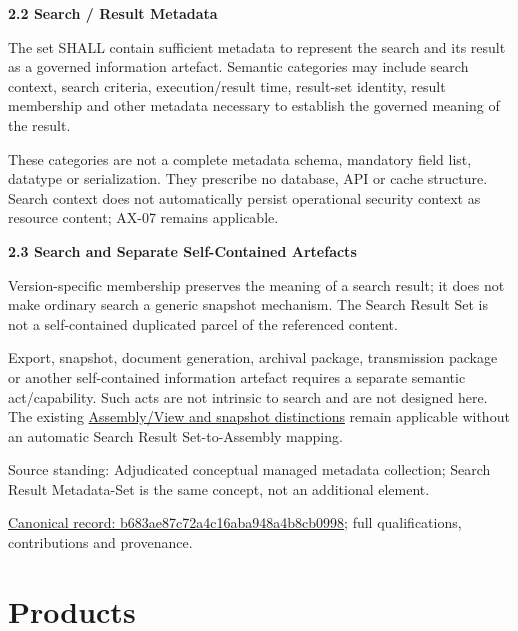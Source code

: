 \par\medskip\textbf{2.2 Search / Result Metadata}\par


The set SHALL contain sufficient metadata to represent the search and its
result as a governed information artefact. Semantic categories may include
search context, search criteria, execution/result time, result-set identity,
result membership and other metadata necessary to establish the governed
meaning of the result.



These categories are not a complete metadata schema, mandatory field list,
datatype or serialization. They prescribe no database, API or cache structure.
Search context does not automatically persist operational security context as
resource content; AX-07 remains applicable.



\par\medskip\textbf{2.3 Search and Separate Self-Contained Artefacts}\par


Version-specific membership preserves the meaning of a search result; it does
not make ordinary search a generic snapshot mechanism. The Search Result Set
is not a self-contained duplicated parcel of the referenced content.



Export, snapshot, document generation, archival package, transmission package
or another self-contained information artefact requires a separate semantic
act/capability. Such acts are not intrinsic to search and are not designed here.
The existing \href{\detokenize{../../../../../docs/markdown/04-information-architecture/assemblies-views/assemblies-and-views.md#3-assembly-lifecycle-vs-constituent-lifecycle}}{Assembly/View and snapshot distinctions}
remain applicable without an automatic Search Result Set-to-Assembly mapping.



Source standing: Adjudicated conceptual managed metadata collection; Search Result Metadata-Set is the same concept, not an additional element.


{\footnotesize \href{../../../../continuum/business/business-object/b683ae87c72a4c16aba948a4b8cb0998.md}{Canonical record: b683ae87c72a4c16aba948a4b8cb0998}; full qualifications, contributions and provenance.}\par
\chapter{Products}

